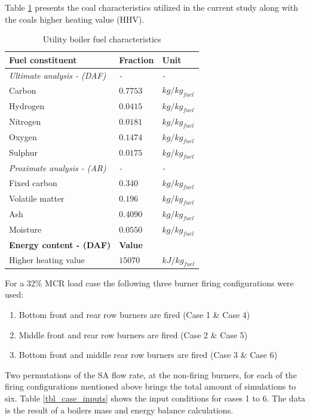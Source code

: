 \documentclass[review]{elsarticle}
\begin{document}
Table \ref{tbl_fuel} presents the coal characteristics utilized in the current study along with the coals higher heating value (HHV).
\begin{table}[h!]
\centering
\caption{Utility boiler fuel characteristics}
\vspace{5mm}
\label{tbl_fuel}
{\tabulinesep=1.2mm
\begin{tabularx}{\textwidth}{p{} p{} l}
\hline
\textbf{Fuel constituent} & \textbf{Fraction} & \textbf{Unit}\\
\hline
\textit{Ultimate analysis - (DAF)} & \textit{-} & \textit{-}\\
Carbon & $0.7753$ & $kg/kg_{fuel}$\\
Hydrogen & $0.0415$ & $kg/kg_{fuel}$\\
Nitrogen & $0.0181$ & $kg/kg_{fuel}$\\
Oxygen & $0.1474$ & $kg/kg_{fuel}$\\
Sulphur & $0.0175$ & $kg/kg_{fuel}$\\
\textit{Proximate analysis - (AR)} & \textit{-} & \textit{-}\\
Fixed carbon & $0.340$ & $kg/kg_{fuel}$\\
Volatile matter & $0.196$ & $kg/kg_{fuel}$\\
Ash & $0.4090$ & $kg/kg_{fuel}$\\
Moisture & $0.0550$ & $kg/kg_{fuel}$\\
\hline
\textbf{Energy content - (DAF)} & \textbf{Value} &\\
\hline
Higher heating value & $15070$ & $kJ/kg_{fuel}$\\
\hline
\end{tabularx}}
\end{table}

For a 32\% MCR load case the following three burner firing configurations were used:
\begin{enumerate}
\item Bottom front and rear row burners are fired (Case 1 \& Case 4)
\item Middle front and rear row burners are fired (Case 2 \& Case 5)
\item Bottom front and middle rear row burners are fired (Case 3 \& Case 6)
\end{enumerate}

Two permutations of the SA flow rate, at the non-firing burners, for each of the firing configurations mentioned above brings the total amount of simulations to six. Table \ref{tbl_case_inputs} shows the input conditions for cases 1 to 6. The data is the result of a boilers mass and energy balance calculations.
\end{document}
